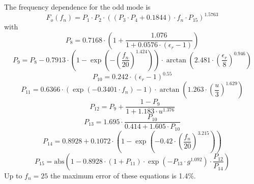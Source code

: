 \documentclass[10pt]{report}
\begin{document}
The frequency dependence for the odd mode is
\begin{equation}
F_o(f_n) = P_1\cdot P_2\cdot ((P_3\cdot P_4 + 0.1844)\cdot f_n\cdot P_{15})^{1.5763}
\end{equation}
with
\begin{equation}
P_8 = 0.7168\cdot \left(1 + \frac{1.076}{1+0.0576\cdot (\epsilon_r-1)} \right)
\end{equation}
\begin{equation}
P_9 = P_8 - 0.7913\cdot\left( 1-\exp\left( -\left( \frac{f_n}{20}\right) ^{1.424} \right) \right)
     \cdot\arctan\left( 2.481\cdot\left( \frac{\epsilon_r}{8}\right) ^{0.946} \right)
\end{equation}
\begin{equation}
P_{10} = 0.242\cdot (\epsilon_r-1)^{0.55}
\end{equation}
\begin{equation}
P_{11} = 0.6366\cdot (\exp(-0.3401\cdot f_n)-1) \cdot
      \arctan\left(1.263\cdot\left( \frac{u}{3} \right) ^{1.629} \right)
\end{equation}
\begin{equation}
P_{12} = P_9 + \frac{1-P_9}{1+1.183\cdot u^{1.376}}
\end{equation}
\begin{equation}
P_{13} = 1.695\cdot \frac{P_{10}}{0.414+1.605\cdot P_{10}}
\end{equation}
\begin{equation}
P_{14} = 0.8928 + 0.1072\cdot \left( 1-\exp\left(-0.42\cdot\left(
        \frac{f_n}{20} \right) ^{3.215} \right)\right)
\end{equation}
\begin{equation}
P_{15} = \text{abs}\left( 1 - 0.8928\cdot (1+P_{11}) \cdot \exp(-P_{13}\cdot g^{1.092})\cdot
         \frac{P_{12}}{P_{14}} \right)
\end{equation}
Up to $f_n=25$ the maximum error of these equations is 1.4\%.

\addvspace{12pt}
\end{document}
